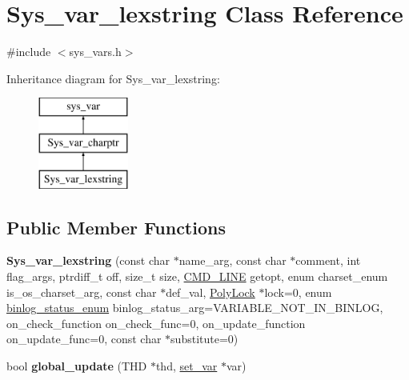 \hypertarget{classSys__var__lexstring}{}\section{Sys\+\_\+var\+\_\+lexstring Class Reference}
\label{classSys__var__lexstring}


{\ttfamily \#include $<$sys\+\_\+vars.\+h$>$}

Inheritance diagram for Sys\+\_\+var\+\_\+lexstring\+:\begin{figure}[H]
\begin{center}
\leavevmode
\includegraphics[height=3.000000cm]{classSys__var__lexstring}
\end{center}
\end{figure}
\subsection*{Public Member Functions}
\begin{DoxyCompactItemize}
\item 
\mbox{\label{classSys__var__lexstring_ab80c78312d8e80951e74885f2e457a71}} 
{\bfseries Sys\+\_\+var\+\_\+lexstring} (const char $\ast$name\+\_\+arg, const char $\ast$comment, int flag\+\_\+args, ptrdiff\+\_\+t off, size\+\_\+t size, \mbox{\hyperlink{structCMD__LINE}{C\+M\+D\+\_\+\+L\+I\+NE}} getopt, enum charset\+\_\+enum is\+\_\+os\+\_\+charset\+\_\+arg, const char $\ast$def\+\_\+val, \mbox{\hyperlink{classPolyLock}{Poly\+Lock}} $\ast$lock=0, enum \mbox{\hyperlink{classsys__var_a664520ec82191888717c86085bfa83ce}{binlog\+\_\+status\+\_\+enum}} binlog\+\_\+status\+\_\+arg=V\+A\+R\+I\+A\+B\+L\+E\+\_\+\+N\+O\+T\+\_\+\+I\+N\+\_\+\+B\+I\+N\+L\+OG, on\+\_\+check\+\_\+function on\+\_\+check\+\_\+func=0, on\+\_\+update\+\_\+function on\+\_\+update\+\_\+func=0, const char $\ast$substitute=0)
\item 
\mbox{\label{classSys__var__lexstring_a55eab7c173494bcdc519ea3af776a4e9}} 
bool {\bfseries global\+\_\+update} (T\+HD $\ast$thd, \mbox{\hyperlink{classset__var}{set\+\_\+var}} $\ast$var)
\end{DoxyCompactItemize}
